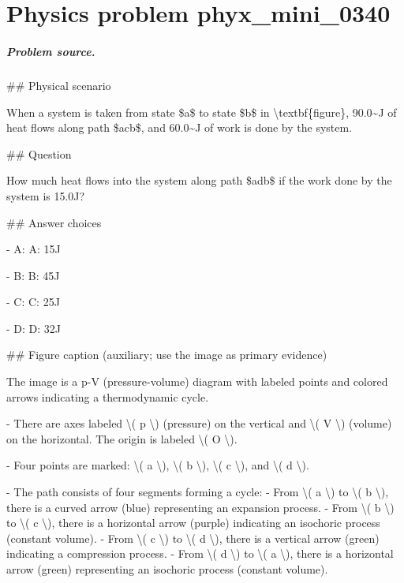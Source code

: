 
\chapter{Physics problem phyx\_mini\_0340}
\label{ch:PhyXMiniProblems_problem_phyx_mini_0340}

\paragraph{Problem source.}
\#\# Physical scenario

When a system is taken from state \$a\$ to state \$b\$ in \textbackslash{}textbf\{figure\}, 90.0\textasciitilde{}J of heat flows along path \$acb\$, and 60.0\textasciitilde{}J of work is done by the system.

\#\# Question

How much heat flows into the system along path \$adb\$ if the work done by the system is 15.0J?

\#\# Answer choices

- A: A: 15J

- B: B: 45J

- C: C: 25J

- D: D: 32J

\#\# Figure caption (auxiliary; use the image as primary evidence)

The image is a p-V (pressure-volume) diagram with labeled points and colored arrows indicating a thermodynamic cycle. 

- There are axes labeled \textbackslash{}( p \textbackslash{}) (pressure) on the vertical and \textbackslash{}( V \textbackslash{}) (volume) on the horizontal. The origin is labeled \textbackslash{}( O \textbackslash{}).
  
- Four points are marked: \textbackslash{}( a \textbackslash{}), \textbackslash{}( b \textbackslash{}), \textbackslash{}( c \textbackslash{}), and \textbackslash{}( d \textbackslash{}).

- The path consists of four segments forming a cycle:
  - From \textbackslash{}( a \textbackslash{}) to \textbackslash{}( b \textbackslash{}), there is a curved arrow (blue) representing an expansion process.
  - From \textbackslash{}( b \textbackslash{}) to \textbackslash{}( c \textbackslash{}), there is a horizontal arrow (purple) indicating an isochoric process (constant volume).
  - From \textbackslash{}( c \textbackslash{}) to \textbackslash{}( d \textbackslash{}), there is a vertical arrow (green) indicating a compression process.
  - From \textbackslash{}( d \textbackslash{}) to \textbackslash{}( a \textbackslash{}), there is a horizontal arrow (green) representing an isochoric process (constant volume).

